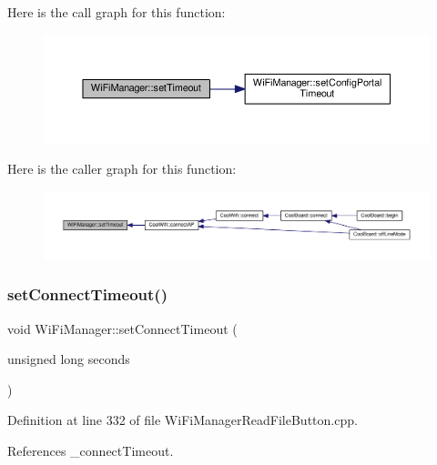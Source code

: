 Here is the call graph for this function\+:\nopagebreak
\begin{figure}[H]
\begin{center}
\leavevmode
\includegraphics[width=350pt]{d4/dc8/class_wi_fi_manager_aa6493d59c284ff245edb767ff684756d_cgraph}
\end{center}
\end{figure}
Here is the caller graph for this function\+:\nopagebreak
\begin{figure}[H]
\begin{center}
\leavevmode
\includegraphics[width=350pt]{d4/dc8/class_wi_fi_manager_aa6493d59c284ff245edb767ff684756d_icgraph}
\end{center}
\end{figure}
\mbox{\label{class_wi_fi_manager_a508fa98e77d165b29764f68d48b7a349}} 
\subsubsection{\texorpdfstring{set\+Connect\+Timeout()}{setConnectTimeout()}}
{\footnotesize\ttfamily void Wi\+Fi\+Manager\+::set\+Connect\+Timeout (\begin{DoxyParamCaption}\item[{unsigned long}]{seconds }\end{DoxyParamCaption})}



Definition at line 332 of file Wi\+Fi\+Manager\+Read\+File\+Button.\+cpp.



References \+\_\+connect\+Timeout.

\mbox{\label{class_wi_fi_manager_a70d7f17596b9f10c3e4770702ac991c5}} 

